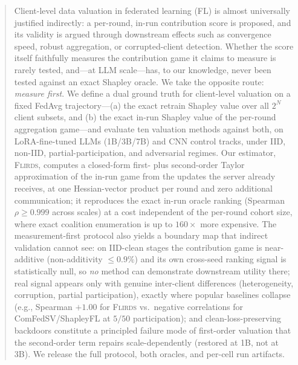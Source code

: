 \begin{abstract}
Client-level data valuation in federated learning (FL) is almost universally
justified indirectly: a per-round, in-run contribution score is proposed, and its
validity is argued through downstream effects such as convergence speed, robust
aggregation, or corrupted-client detection. Whether the score itself faithfully
measures the contribution game it claims to measure is rarely tested, and---at LLM
scale---has, to our knowledge, never been tested against an exact Shapley oracle.
We take the opposite route: \emph{measure first}. We define a dual ground truth for
client-level valuation on a fixed FedAvg trajectory---(a) the exact retrain Shapley
value over all $2^N$ client subsets, and (b) the exact in-run Shapley value of the
per-round aggregation game---and evaluate ten valuation methods against both, on
LoRA-fine-tuned LLMs (1B/3B/7B) and CNN control tracks, under IID, non-IID,
partial-participation, and adversarial regimes. Our estimator, \textsc{Flirds},
computes a closed-form first- plus second-order Taylor approximation of the
in-run game from the updates the server already receives, at one
Hessian-vector product per round and zero additional communication; it reproduces the
exact in-run oracle ranking (Spearman $\rho \ge 0.999$ across scales) at a cost
independent of the per-round cohort size, where exact coalition enumeration is up to
$160\times$ more expensive. The measurement-first protocol also yields a boundary
map that indirect validation cannot see: on IID-clean stages the contribution game
is near-additive (non-additivity $\le 0.9\%$) and its own cross-seed ranking signal
is statistically null, so \emph{no} method can demonstrate downstream utility there;
real signal appears only with genuine inter-client differences (heterogeneity,
corruption, partial participation), exactly where popular baselines collapse
(e.g., Spearman $+1.00$ for \textsc{Flirds} vs.\ negative correlations for
ComFedSV/ShapleyFL at $5/50$ participation); and clean-loss-preserving backdoors
constitute a principled failure mode of first-order valuation that the second-order
term repairs scale-dependently (restored at 1B, not at 3B).  We release the full protocol, both
oracles, and per-cell run artifacts. 
\end{abstract}
